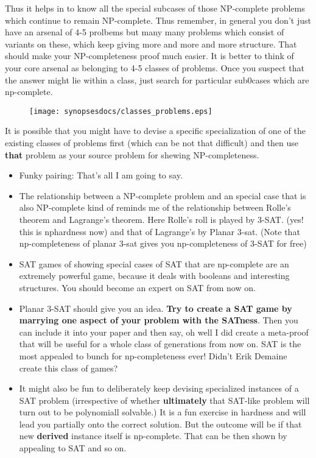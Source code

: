 \begin{itemize}
Thus it helps in to know all the special subcases of those NP-complete problems which continue to remain NP-complete. 
Thus remember, in general  you don't just have an arsenal of 4-5 prolbems but many many problems which consist of 
variants on these, which keep giving more and more and more structure. That should make your NP-completeness proof much easier. 
It is better to think of your core arsenal as belonging to 4-5 classes of problems. Once you suspect that the answer might lie 
within a class, just search for particular sub0cases which are np-complete.
\end{itemize}

\begin{figure}[h]
\centering
\texttt{[image: synopsesdocs/classes\_problems.eps]}
\end{figure}

It is possible that you might have to devise a specific specialization of one of the existing classes of problems first
(which can be not that difficult) and then use \textbf{that} problem as your source problem for shewing NP-completeness.

\begin{itemize}
\item Funky pairing: That's all I am going to say.

\item The relationship between a NP-complete problem and an special case that is also NP-complete kind of reminds me of the 
relationship between Rolle's theorem and Lagrange's theorem. Here Rolle's roll is played by 3-SAT. (yes! this is nphardness now)
and that of Lagrange's by Planar 3-sat. (Note that np-completeness of planar 3-sat gives you np-completeness of 3-SAT for free)

\item SAT games of showing special cases of SAT that are np-complete are an extremely powerful game, because it deals with booleans
and interesting structures. You should become an expert on SAT from now on.

\item Planar 3-SAT should give you an idea. \textbf{Try to create a SAT game by marrying one aspect of your problem with the SATness}. Then 
you can include it into your paper and then say, oh well I did create a meta-proof that will be useful for a whole class of 
generations from now on. SAT is the most appealed to bunch for np-completeness ever! Didn't Erik Demaine create this class 
of games?

\item It might also be fun to deliberately keep devising specialized instances of a SAT problem (irrespective of whether \textbf{ultimately} that SAT-like 
problem will turn out to be polynomiall solvable.) It is a fun exercise in hardness and will lead you partially onto the correct solution.
But the outcome will be if that new \textbf{derived} instance itself is np-complete. That can be then shown by appealing to SAT and so on.
\end{itemize}

